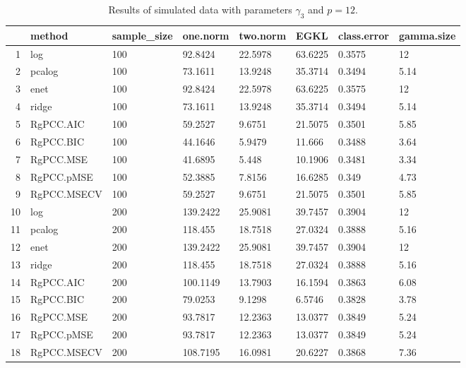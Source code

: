 \begin{table}[ht]
\centering
\begin{tabular}{rlllllll}
  \hline
 & method & sample\_size & one.norm & two.norm & EGKL & class.error & gamma.size \\ 
  \hline
1 & log & 100 & 92.8424 & 22.5978 & 63.6225 & 0.3575 & 12 \\ 
  2 & pcalog & 100 & 73.1611 & 13.9248 & 35.3714 & 0.3494 & 5.14 \\ 
  3 & enet & 100 & 92.8424 & 22.5978 & 63.6225 & 0.3575 & 12 \\ 
  4 & ridge & 100 & 73.1611 & 13.9248 & 35.3714 & 0.3494 & 5.14 \\ 
  5 & RgPCC.AIC & 100 & 59.2527 & 9.6751 & 21.5075 & 0.3501 & 5.85 \\ 
  6 & RgPCC.BIC & 100 & 44.1646 & 5.9479 & 11.666 & 0.3488 & 3.64 \\ 
  7 & RgPCC.MSE & 100 & 41.6895 & 5.448 & 10.1906 & 0.3481 & 3.34 \\ 
  8 & RgPCC.pMSE & 100 & 52.3885 & 7.8156 & 16.6285 & 0.349 & 4.73 \\ 
  9 & RgPCC.MSECV & 100 & 59.2527 & 9.6751 & 21.5075 & 0.3501 & 5.85 \\ 
  10 & log & 200 & 139.2422 & 25.9081 & 39.7457 & 0.3904 & 12 \\ 
  11 & pcalog & 200 & 118.455 & 18.7518 & 27.0324 & 0.3888 & 5.16 \\ 
  12 & enet & 200 & 139.2422 & 25.9081 & 39.7457 & 0.3904 & 12 \\ 
  13 & ridge & 200 & 118.455 & 18.7518 & 27.0324 & 0.3888 & 5.16 \\ 
  14 & RgPCC.AIC & 200 & 100.1149 & 13.7903 & 16.1594 & 0.3863 & 6.08 \\ 
  15 & RgPCC.BIC & 200 & 79.0253 & 9.1298 & 6.5746 & 0.3828 & 3.78 \\ 
  16 & RgPCC.MSE & 200 & 93.7817 & 12.2363 & 13.0377 & 0.3849 & 5.24 \\ 
  17 & RgPCC.pMSE & 200 & 93.7817 & 12.2363 & 13.0377 & 0.3849 & 5.24 \\ 
  18 & RgPCC.MSECV & 200 & 108.7195 & 16.0981 & 20.6227 & 0.3868 & 7.36 \\ 
   \hline
\end{tabular}
\caption{Results of simulated data with parameters $\gamma_3$ and $p =12$. } 
\label{fig-3-leadnew-12-metrics-p}
\end{table}
